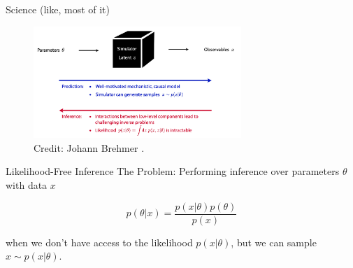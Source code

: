 \documentclass[12pt, aspectratio=169]{beamer}
\begin{document}
\begin{frame}{Science (like, most of it)}   
    \begin{figure}
		\centering
		\includegraphics[width=0.7\textwidth]{"images/science.png"}
        \caption{Credit: Johann Brehmer \parencite{brehmer_slides2022simulation_based_inference_rodem_sinergia_2022pdf_2022}.}
	\end{figure}
\end{frame}

    

			

\begin{frame}{Likelihood-Free Inference}
\alert{The Problem: } Performing inference over parameters $\theta$ with data $x$

$$p(\theta | x) = \frac{p(x | \theta) p(\theta)}{p(x)}$$

when we don't have access to the likelihood $p(x|\theta)$, but we can sample $x \sim p(x|\theta)$.


\end{frame}
\end{document}
